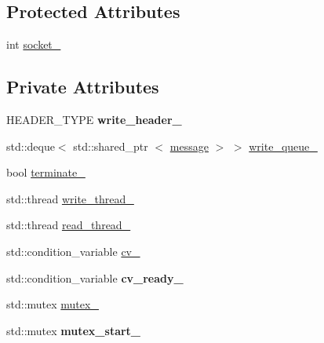 \subsection*{\-Protected \-Attributes}
\begin{DoxyCompactItemize}
\item 
int \hyperlink{classgal_1_1network_1_1communicating_afe5f9de9e2535e261c78485dec4d9e82}{socket\-\_\-}
\end{DoxyCompactItemize}
\subsection*{\-Private \-Attributes}
\begin{DoxyCompactItemize}
\item 
\hypertarget{classgal_1_1network_1_1communicating_addb0099bce03feeb9ff20a5244976c54}{\-H\-E\-A\-D\-E\-R\-\_\-\-T\-Y\-P\-E {\bfseries write\-\_\-header\-\_\-}}\label{classgal_1_1network_1_1communicating_addb0099bce03feeb9ff20a5244976c54}

\item 
std\-::deque$<$ std\-::shared\-\_\-ptr\*
$<$ \hyperlink{classgal_1_1network_1_1message}{message} $>$ $>$ \hyperlink{classgal_1_1network_1_1communicating_abc369b818849e23007089c5f7baf8924}{write\-\_\-queue\-\_\-}
\item 
bool \hyperlink{classgal_1_1network_1_1communicating_a4dc031687aa84ce7e3cca5ce9839d5d7}{terminate\-\_\-}
\item 
std\-::thread \hyperlink{classgal_1_1network_1_1communicating_afc83d88ea30befb842e16a5cf7d5e936}{write\-\_\-thread\-\_\-}
\item 
std\-::thread \hyperlink{classgal_1_1network_1_1communicating_a2d94e9fcd2cd765768b354a87b726bf3}{read\-\_\-thread\-\_\-}
\item 
std\-::condition\-\_\-variable \hyperlink{classgal_1_1network_1_1communicating_aff2d38da260c4e5f9182eec6f8bc16bd}{cv\-\_\-}
\item 
\hypertarget{classgal_1_1network_1_1communicating_ac1027b607900f3d087baac99aba3507e}{std\-::condition\-\_\-variable {\bfseries cv\-\_\-ready\-\_\-}}\label{classgal_1_1network_1_1communicating_ac1027b607900f3d087baac99aba3507e}

\item 
std\-::mutex \hyperlink{classgal_1_1network_1_1communicating_a7afe6898e58ca9087f05124cf4d18b65}{mutex\-\_\-}
\item 
\hypertarget{classgal_1_1network_1_1communicating_a6f59c7c2c3034687f96369a9c76cc90b}{std\-::mutex {\bfseries mutex\-\_\-start\-\_\-}}\label{classgal_1_1network_1_1communicating_a6f59c7c2c3034687f96369a9c76cc90b}

\end{DoxyCompactItemize}
